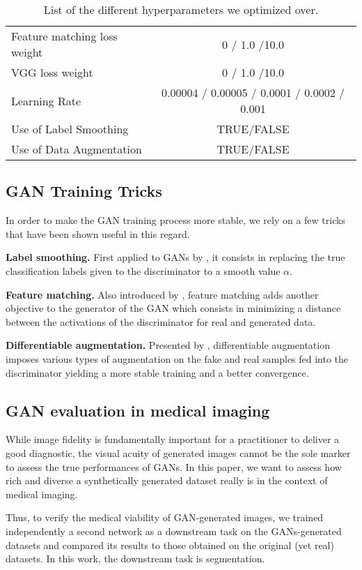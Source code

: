 \documentclass[preprint,12pt, authoryear]{elsarticle}
\begin{document}
\begin{table*}
{\begin{tabular}{l|c}
Feature matching loss weight           & 0 / 1.0 /10.0 \\
VGG loss weight                        & 0 / 1.0 /10.0 \\
Learning Rate                          & 0.00004 / 0.00005 / 0.0001 / 0.0002 / 0.001 \\
Use of Label Smoothing \citep{Salimans2016ImprovedTF}                & TRUE/FALSE      \\
Use of Data Augmentation                &  TRUE/FALSE           \\
\hline
\end{tabular}}
\caption{List of the different hyperparameters we optimized over.}
\label{tab_hparams}
\end{table*}


\subsection{GAN Training Tricks}
In order to make the GAN training process more stable, we rely on a few tricks that have been shown useful in this regard.

\textbf{Label smoothing.} First applied to GANs by \cite{Salimans2016ImprovedTF}, it consists in replacing the true classification labels given to the discriminator to a smooth value $\alpha$.

\textbf{Feature matching.} Also introduced by \cite{Salimans2016ImprovedTF}, feature matching adds another objective to the generator of the GAN which consists in minimizing a distance between the activations of the discriminator for real and generated data.

\textbf{Differentiable augmentation.} Presented by \cite{Zhao2020DifferentiableAF}, differentiable augmentation imposes various types of augmentation on the fake and real samples fed into the discriminator yielding a more stable training and a better convergence.


\subsection{GAN evaluation in medical imaging}
While image fidelity is fundamentally important for a practitioner to deliver a good diagnostic, the visual acuity of generated images cannot be the sole marker to assess the true performances of GANs.  In this paper, we want to assess how rich and diverse a synthetically generated dataset really is in the context of medical imaging.  

Thus, to verify the medical viability of GAN-generated images, we trained independently a second network as a downstream task on the GANs-generated datasets and compared its results to those obtained on the original (yet real) datasets.  In this work, the downstream task is segmentation.
\end{document}
